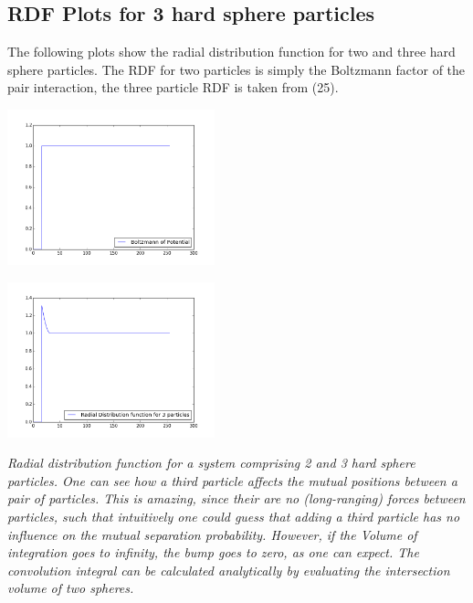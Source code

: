 \documentclass[11pt,a4paper]{article}
\begin{document}
\subsection{RDF Plots for 3 hard sphere particles }
The following plots show the radial distribution function for two and three hard sphere particles. The RDF for two particles
is simply the Boltzmann factor of the pair interaction, the three particle RDF is taken from (25).
\begin{minipage}[hbt]{4cm}
	\centering
	\includegraphics[width=6cm]{rdfHS2P.png}
\end{minipage}
\hfill
\begin{minipage}[hbt]{4cm}
	\centering
	\includegraphics[width=6cm]{rdfHS3P.png}
\end{minipage}
\newline
\textit{Radial distribution function for a system comprising 2 and 3 hard sphere particles. 
One can see how a third particle affects the mutual positions between a pair of particles. 
This is amazing, since their are no (long-ranging) forces between particles, such that intuitively one could
guess that adding a third particle has no influence on the mutual separation probability. 
However, if the Volume of integration goes to infinity, the bump goes to zero, as one can expect. \newline
The convolution integral can be calculated analytically by evaluating the intersection volume of two spheres.
}
\end{document}
